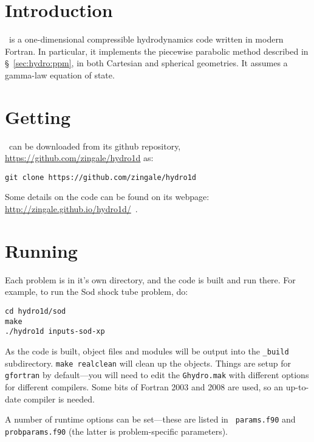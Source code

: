 \label{app:hydro1d}


\section{Introduction}

\hydrooned\ is a one-dimensional compressible hydrodynamics code written
in modern Fortran.  In particular, it implements the piecewise parabolic
method described in \S~\ref{sec:hydro:ppm}, in both Cartesian and spherical
geometries.  It assumes a gamma-law equation of state.


\section{Getting \hydrooned}

\hydrooned\ can be downloaded from its github repository, \url{https://github.com/zingale/hydro1d} as:
\begin{verbatim}
git clone https://github.com/zingale/hydro1d
\end{verbatim}

Some details on the code can be found on its webpage:
\url{http://zingale.github.io/hydro1d/}\, .






\section{Running \hydrooned}

Each problem is in it's own directory, and the code is built and run
there.  For example, to run the Sod shock tube problem, do:
\begin{verbatim}
cd hydro1d/sod
make
./hydro1d inputs-sod-xp
\end{verbatim}

As the code is built, object files and modules will be output into the
{\tt \_build} subdirectory.  {\tt make realclean} will clean up the
objects.  Things are setup for {\tt gfortran} by default---you will
need to edit the {\tt Ghydro.mak} with different options for different
compilers. Some bits of Fortran 2003 and 2008 are used, so an
up-to-date compiler is needed.

A number of runtime options can be set---these are listed in {\tt
  params.f90} and {\tt probparams.f90} (the latter is problem-specific
parameters).



